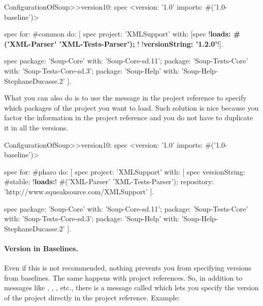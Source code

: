 \documentclass[a4paper,10pt,twoside]{book}
\begin{document}
\begin{code}{}
ConfigurationOfSoup>>version10: spec 
	<version: '1.0' imports:  #('1.0-baseline')>
	 
	spec for: #common do: [	
		spec 
			project: 'XMLSupport' 
			with: [spec 
						!\textbf{loads: \#('XML-Parser' 'XML-Tests-Parser'); }!
						!\textbf{versionString: '1.2.0'}!].
	
		spec 
			package: 'Soup-Core' with: 'Soup-Core-sd.11'; 
			package: 'Soup-Tests-Core' with: 'Soup-Tests-Core-sd.3';
			package: 'Soup-Help' with: 'Soup-Help-StephaneDucasse.2' ].
\end{code}


What you can also do is to use the  message in the project reference to specify which packages of the project you want to load. Such solution is nice because you factor the information in the project reference and you do not have to duplicate it in all the versions.

\begin{code}{}
ConfigurationOfSoup>>version10: spec 
	<version: '1.0' imports:  #('1.0-baseline')>
	 
	spec for: #pharo do: [	
		spec project: 'XMLSupport' with: [
                       spec 
                          versionString: #stable;
                          !\textbf{loads:}! #('XML-Parser' 'XML-Tests-Parser');
                          repository: 'http://www.squeaksource.com/XMLSupport' ].

	spec 
			package: 'Soup-Core' with: 'Soup-Core-sd.11'; 
			package: 'Soup-Tests-Core' with: 'Soup-Tests-Core-sd.3';
			package: 'Soup-Help' with: 'Soup-Help-StephaneDucasse.2' ].
\end{code}



\paragraph{Version in Baselines.} Even if this is not recommended, nothing prevents you from specifying versions from baselines. The same happens with project references. So, in addition to messages like , , , etc., there is a message called  which lets you specify the version of the project directly in the project reference. Example:
\end{document}
